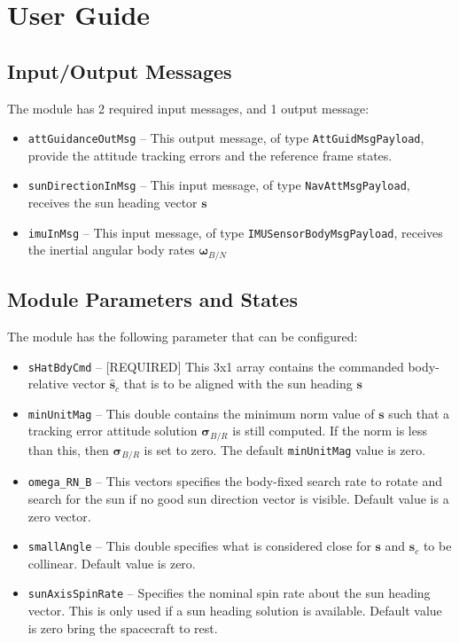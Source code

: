 
\section{User Guide}
\subsection{Input/Output Messages}
The module has 2 required input messages, and 1 output message:
\begin{itemize}
	\item {\tt attGuidanceOutMsg} -- This output message, of type {\tt AttGuidMsgPayload}, provide the attitude tracking errors and the reference frame states.
	\item {\tt sunDirectionInMsg} -- This input message, of type {\tt NavAttMsgPayload}, receives the sun heading vector $\bm s$
	\item {\tt imuInMsg} -- This input message, of type {\tt IMUSensorBodyMsgPayload}, receives the inertial angular body rates $\bm \omega_{B/N}$
\end{itemize}

\subsection{Module Parameters and States}
The module has the following parameter that can be configured:
\begin{itemize}
	\item {\tt sHatBdyCmd} -- [REQUIRED] This 3x1 array contains the commanded body-relative vector $\hat{\bm s}_{c}$ that is to be aligned with the sun heading $\bm s$
	
	\item {\tt minUnitMag} -- This double contains the minimum norm value of $\bm s$ such that a tracking error attitude solution $\bm\sigma_{B/R}$ is still computed.  If the norm is less than this, then $\bm\sigma_{B/R}$ is set to zero.    The default {\tt minUnitMag} value is zero. 
	
	\item {\tt omega\_RN\_B} -- This vectors specifies the body-fixed search rate to rotate and search for the sun if no good sun direction vector is visible.  Default value is a zero vector.  

	\item {\tt smallAngle} -- This double specifies what is considered close for $\bm s$ and $\hat{\bm s}_{c}$ to be collinear.  Default value is zero.  
	
	\item {\tt sunAxisSpinRate} -- Specifies the nominal spin rate about the sun heading vector.  This is only used if a sun heading solution is available.  Default value is zero bring the spacecraft to rest. 
	
\end{itemize}

